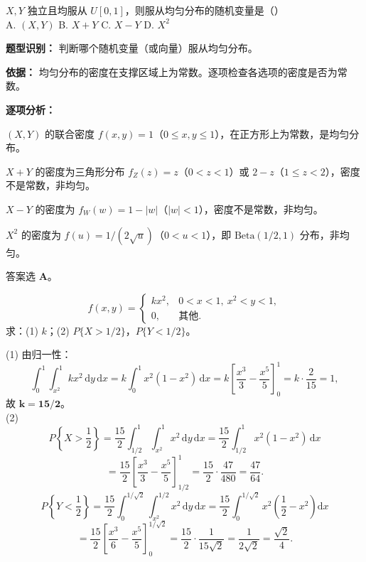 ﻿\documentclass[lang=cn,11pt]{elegantbook}
\begin{document}
\begin{exercise}[联合均匀分布的判断] \label{exer:3-c12b}
$X,Y$ 独立且均服从 $U[0,1]$，则服从均匀分布的随机变量是（\quad）\\
A. $(X,Y)$ \quad B. $X+Y$ \quad C. $X-Y$ \quad D. $X^2$
\end{exercise}
\begin{solution}
\textbf{题型识别：} 判断哪个随机变量（或向量）服从均匀分布。

\textbf{依据：} 均匀分布的密度在支撑区域上为常数。逐项检查各选项的密度是否为常数。

\textbf{逐项分析：}

$(X,Y)$ 的联合密度 $f(x,y)=1$（$0\leqslant x,y\leqslant 1$），在正方形上为常数，是均匀分布。

$X+Y$ 的密度为三角形分布 $f_Z(z) = z$（$0<z<1$）或 $2-z$（$1\leqslant z<2$），密度不是常数，非均匀。

$X-Y$ 的密度为 $f_W(w) = 1-|w|$（$|w|<1$），密度不是常数，非均匀。

$X^2$ 的密度为 $f(u) = 1/(2\sqrt{u})$（$0<u<1$），即 $\text{Beta}(1/2,1)$ 分布，非均匀。

答案选 \textbf{A}。
\end{solution}


\begin{exercise}[抛物线区域上的均匀分布] \label{exer:3-c11}
\[f(x,y) = \begin{cases} kx^2, & 0 < x < 1,\ x^2 < y < 1, \\ 0, & \text{其他}. \end{cases}\]
求：(1) $k$；(2) $P\{X > 1/2\}$，$P\{Y < 1/2\}$。
\end{exercise}
\begin{solution}
(1) 由归一性：
\[
\int_0^1\int_{x^2}^1 kx^2\,\mathrm{d}y\,\mathrm{d}x = k\int_0^1 x^2(1-x^2)\,\mathrm{d}x = k\left[\frac{x^3}{3} - \frac{x^5}{5}\right]_0^1 = k\cdot\frac{2}{15} = 1,
\]
故 $\boldsymbol{k = 15/2}$。\\
(2)
\[
P\left\{X > \frac{1}{2}\right\} = \frac{15}{2}\int_{1/2}^1\int_{x^2}^1 x^2\,\mathrm{d}y\,\mathrm{d}x = \frac{15}{2}\int_{1/2}^1 x^2(1-x^2)\,\mathrm{d}x
\]
\[
= \frac{15}{2}\left[\frac{x^3}{3} - \frac{x^5}{5}\right]_{1/2}^1 = \frac{15}{2}\cdot\frac{47}{480} = \frac{47}{64}.
\]
\[
P\left\{Y < \frac{1}{2}\right\} = \frac{15}{2}\int_0^{1/\sqrt{2}}\int_{x^2}^{1/2} x^2\,\mathrm{d}y\,\mathrm{d}x = \frac{15}{2}\int_0^{1/\sqrt{2}}x^2\!\left(\frac{1}{2}-x^2\right)\mathrm{d}x
\]
\[
= \frac{15}{2}\left[\frac{x^3}{6} - \frac{x^5}{5}\right]_0^{1/\sqrt{2}} = \frac{15}{2}\cdot\frac{1}{15\sqrt{2}} = \frac{1}{2\sqrt{2}} = \frac{\sqrt{2}}{4}.
\]
\end{solution}
\end{document}
